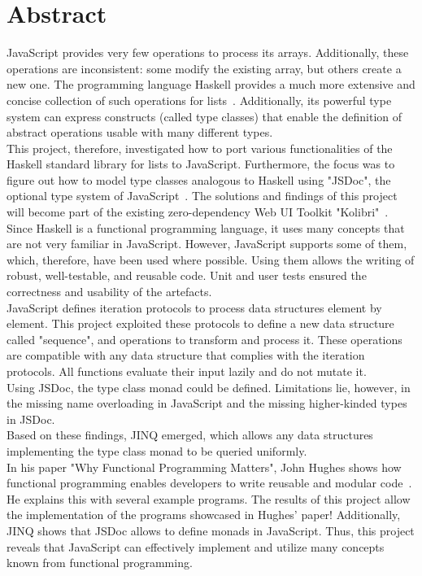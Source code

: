 \chapter*{Abstract}
JavaScript provides very few operations to process its arrays.
Additionally, these operations are inconsistent: some modify the existing
array, but others create a new one. The programming language Haskell provides a
much more extensive and concise collection of such operations for
lists~\cite{haskell_list}. Additionally, its powerful type system can express
constructs (called type classes) that enable the definition of abstract
operations usable with many different types.\\ 
This project, therefore, investigated how to port various functionalities of
the Haskell standard library for lists to JavaScript. Furthermore, the focus
was to figure out how to model type classes analogous to Haskell using "JSDoc",
the optional type system of JavaScript~\cite{jsdoc_use_2023}. The solutions and
findings of this project will become part of the existing zero-dependency Web
UI Toolkit "Kolibri"~\cite{kolibri}. \\
Since Haskell is a functional programming language, it uses many concepts that
are not very familiar in JavaScript. However, JavaScript supports some of them,
which, therefore, have been used where possible. Using them allows the writing
of robust, well-testable, and reusable code. Unit and user tests ensured the
correctness and usability of the artefacts. \\
JavaScript defines iteration protocols to process data structures element by
element. This project exploited these protocols to define a new data structure
called "sequence", and operations to transform and process it. These operations
are compatible with any data structure that complies with the iteration
protocols. All functions evaluate their input lazily and do not mutate it.\\
Using JSDoc, the type class monad could be defined. Limitations lie, however,
in the missing name overloading in JavaScript and the missing higher-kinded
types in JSDoc.\\
Based on these findings, JINQ emerged, which allows any data structures
implementing the type class monad to be queried uniformly.\\
In his paper "Why Functional Programming Matters", John Hughes shows how
functional programming enables developers to write reusable and modular
code~\cite{hughes_why_1989}. He explains this with several example programs.
The results of this project allow the implementation of the programs showcased
in Hughes' paper! Additionally, JINQ shows that JSDoc allows to define
monads in JavaScript. Thus, this project reveals that JavaScript can
effectively implement and utilize many concepts known from functional
programming.
